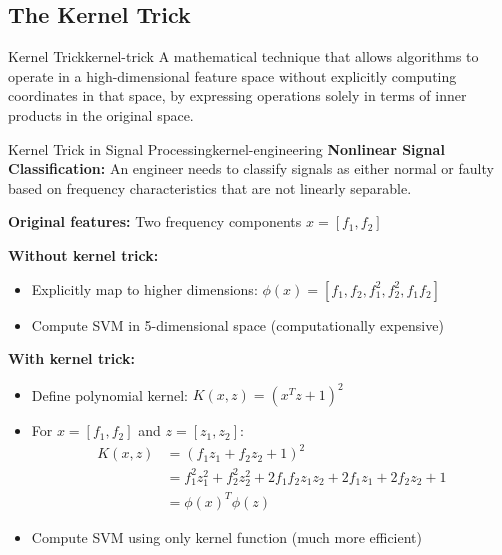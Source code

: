 \documentclass[12pt]{article}
\begin{document}
\subsection{The Kernel Trick}

\begin{definition}{Kernel Trick}{kernel-trick}
A mathematical technique that allows algorithms to operate in a high-dimensional feature space without explicitly computing coordinates in that space, by expressing operations solely in terms of inner products in the original space.
\end{definition}

\begin{example}{Kernel Trick in Signal Processing}{kernel-engineering}
\textbf{Nonlinear Signal Classification:} An engineer needs to classify signals as either normal or faulty based on frequency characteristics that are not linearly separable.

\textbf{Original features:} Two frequency components $x = [f_1, f_2]$

\textbf{Without kernel trick:}
\begin{itemize}
    \item Explicitly map to higher dimensions: $\phi(x) = [f_1, f_2, f_1^2, f_2^2, f_1f_2]$
    \item Compute SVM in 5-dimensional space (computationally expensive)
\end{itemize}

\textbf{With kernel trick:}
\begin{itemize}
    \item Define polynomial kernel: $K(x, z) = (x^T z + 1)^2$
    \item For $x = [f_1, f_2]$ and $z = [z_1, z_2]$:
    \begin{align}
    K(x, z) &= (f_1z_1 + f_2z_2 + 1)^2 \\
    &= f_1^2z_1^2 + f_2^2z_2^2 + 2f_1f_2z_1z_2 + 2f_1z_1 + 2f_2z_2 + 1 \\
    &= \phi(x)^T\phi(z)
    \end{align}
    \item Compute SVM using only kernel function (much more efficient)
\end{itemize}

\begin{center}
\end{center}
\end{example}
\end{document}

